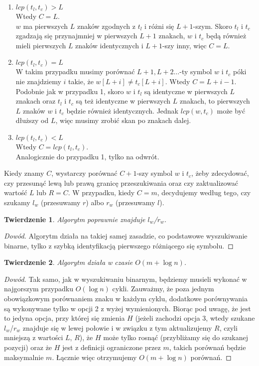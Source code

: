 \documentclass[12pt]{article}
\newtheorem*{theorem}{Twierdzenie}
\begin{document}
\begin{enumerate}
    \item $lcp(t_l, t_c) > L$ \\
          Wtedy $C = L$. \\
          $w$ ma pierwszych $L$ znaków zgodnych z $t_l$ i różni się $L+1$-szym. Skoro $t_l$ i $t_c$ zgadzają się przynajmniej w pierwszych $L+1$ znakach, $w$ i $t_c$ będą również mieli pierwszych $L$ znaków identycznych i $L+1$-szy inny, więc $C = L$.
    \item $lcp(t_l, t_c) = L$ \\
          W takim przypadku musimy porównać $L+1, L+2\ldots$-ty symbol $w$ i $t_c$ póki nie znajdziemy $i$ takie, że $w[L+i] \neq t_c[L+i]$. Wtedy $C = L + i - 1$. \\
          Podobnie jak w przypadku 1, skoro $w$ i $t_l$ są identyczne w pierwszych $L$ znakach oraz $t_l$ i $t_c$ są też identyczne w pierwszych $L$ znakach, to pierwszych $L$ znaków $w$ i $t_c$ będzie również identycznych. Jednak $lcp(w, t_c)$ może być dłuższy od $L$, więc musimy zrobić skan po znakach dalej.  
    \item $lcp(t_l, t_c) < L$ \\
          Wtedy $C = lcp(t_l, t_c)$. \\
          Analogicznie do przypadku 1, tylko na odwrót.
          
\end{enumerate}

Kiedy znamy $C$, wystarczy porównać $C+1$-szy symbol $w$ i $t_c$, żeby zdecydować, czy przesunąć lewą lub prawą granicę przeszukiwania oraz czy zaktualizować wartość $L$ lub $R = C$. W przypadku, kiedy $C = m$, decydujemy według tego, czy szukamy $l_w$ (przesuwamy $r$) albo $r_w$ (przesuwamy $l$).

\begin{theorem}
Algorytm poprawnie znajduje $l_w$/$r_w$.
\end{theorem}

\begin{proof}[Dowód]
Algorytm działa na takiej samej zasadzie, co podstawowe wyszukiwanie binarne, tylko z szybką identyfikacją pierwszego różniącego się symbolu.
\end{proof}

\begin{theorem}
Algorytm działa w czasie $O(m + \log{n})$.
\end{theorem}

\begin{proof}[Dowód]
Tak samo, jak w wyszukiwaniu binarnym, będziemy musieli wykonać w najgorszym przypadku $O(\log{n})$ cykli. Zauważmy, że poza jednym obowiązkowym porównaniem znaku w każdym cyklu, dodatkowe porównywania są wykonywane tylko w opcji 2 z wyżej wymienionych. Biorąc pod uwagę, że jest to jedyna opcja, przy której się zmienia $H$ (jeżeli zachodzi opcja 3, wtedy szukane $l_w$/$r_w$ znajduje się w lewej połowie i w związku z tym aktualizujemy $R$, czyli mniejszą z wartości $L$, $R$), że $H$ może tylko rosnąć (przybliżamy się do szukanej pozycji) oraz że $H$ jest z definicji ograniczone przez $m$, takich porównań będzie maksymalnie $m$. Łącznie więc otrzymujemy $O(m + \log{n})$ porównań.
\end{proof}
\end{document}
